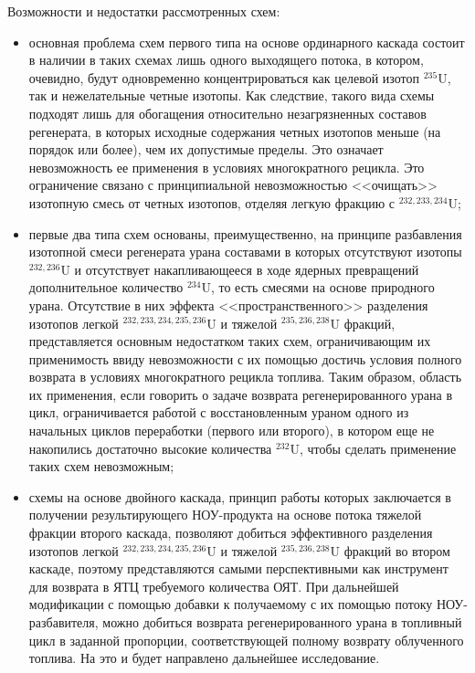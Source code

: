 Возможности и недостатки рассмотренных схем:
\begin{itemize}
  \item основная проблема схем первого типа на основе ординарного каскада состоит в наличии в таких схемах лишь одного выходящего потока, в котором, очевидно, будут одновременно концентрироваться как целевой изотоп $^{235}$U, так и нежелательные четные изотопы. Как следствие, такого вида схемы подходят лишь для обогащения относительно незагрязненных составов регенерата, в которых исходные содержания четных изотопов меньше (на порядок или более), чем их допустимые пределы. Это означает невозможность ее применения в условиях многократного рецикла. Это ограничение связано с принципиальной невозможностью <<очищать>> изотопную смесь от четных изотопов, отделяя легкую фракцию с $^{232,233,234}$U;
  \item первые два типа схем основаны, преимущественно, на принципе разбавления изотопной смеси регенерата урана составами в которых отсутствуют изотопы $^{232,236}$U и отсутствует накапливающееся в ходе ядерных превращений дополнительное количество $^{234}$U, то есть смесями на основе природного урана. Отсутствие в них эффекта <<пространственного>> разделения изотопов легкой $^{232,233,234,235,236}$U и тяжелой $^{235,236,238}$U фракций, представляется основным недостатком таких схем, ограничивающим их применимость ввиду невозможности с их помощью достичь условия полного возврата в условиях многократного рецикла топлива. Таким образом, область их применения, если говорить о задаче возврата регенерированного урана в цикл, ограничивается работой с восстановленным ураном одного из начальных циклов переработки (первого или второго), в котором еще не накопились достаточно высокие количества $^{232}$U, чтобы сделать применение таких схем невозможным;
  \item схемы на основе двойного каскада, принцип работы которых заключается в получении результирующего НОУ-продукта на основе потока тяжелой фракции второго каскада, позволяют добиться эффективного разделения изотопов легкой $^{232,233,234,235,236}$U и тяжелой $^{235,236,238}$U фракций во втором каскаде, поэтому представляются самыми перспективными как инструмент для возврата в ЯТЦ требуемого количества ОЯТ. При дальнейшей модификации с помощью добавки к получаемому с их помощью потоку НОУ-разбавителя, можно добиться возврата регенерированного урана в топливный цикл в заданной пропорции, соответствующей полному возврату облученного топлива. На это и будет направлено дальнейшее исследование.
\end{itemize}



